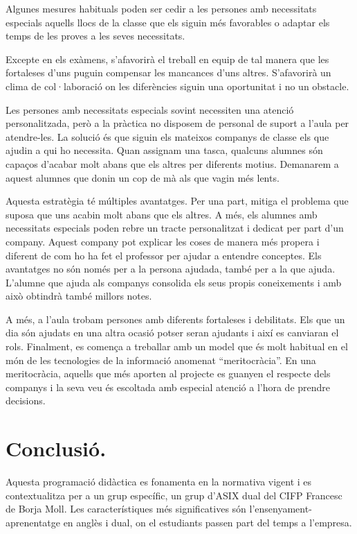 \documentclass[catalan, a4paper, 12pt, titlepage]{article}
\begin{document}
Algunes mesures habituals poden ser cedir a les persones amb necessitats especials aquells llocs de la classe que els siguin més favorables o adaptar els temps de les proves a les seves necessitats.

Excepte en els exàmens, s'afavorirà el treball en equip de tal manera que les fortaleses d'uns puguin compensar les mancances d'uns altres. S'afavorirà un clima de col·laboració on les diferències siguin una oportunitat i no un obstacle.

Les persones amb necessitats especials sovint necessiten una atenció personalitzada, però a la pràctica no disposem de personal de suport a l'aula per atendre-les.
La solució és que siguin els mateixos companys de classe els que ajudin a qui ho necessita.
Quan assignam una tasca, qualcuns alumnes són capaços d'acabar molt abans que els altres per diferents motius.
Demanarem a aquest alumnes que donin un cop de mà als que vagin més lents.

Aquesta estratègia té múltiples avantatges. 
Per una part, mitiga el problema que suposa que uns acabin molt abans que els altres.
A més, els alumnes amb necessitats especials poden rebre un tracte personalitzat i dedicat per part d'un company.
Aquest company pot explicar les coses de manera més propera i diferent de com ho ha fet el professor per ajudar a entendre conceptes.
Els avantatges no són només per a la persona ajudada, també per a la que ajuda.
L'alumne que ajuda als companys consolida els seus propis coneixements i amb això obtindrà també millors notes.

A més, a l'aula trobam persones amb diferents fortaleses i debilitats.
Els que un dia són ajudats en una altra ocasió potser seran ajudants i així es canviaran el rols.
Finalment, es comença a treballar amb un model que és molt habitual en el món de les tecnologies de la informació anomenat ``meritocràcia''.
En una meritocràcia, aquells que més aporten al projecte es guanyen el respecte dels companys i la seva veu és escoltada amb especial atenció a l'hora de prendre decisions.

\section{Conclusió.}
\label{sec:conclusió}

Aquesta programació didàctica es fonamenta en la normativa vigent i es contextualitza per a un grup específic, un grup d'ASIX dual del CIFP Francesc de Borja Moll.
Les característiques més significatives són l'ensenyament-aprenentatge en anglès i dual, on el estudiants passen part del temps a l'empresa.
\end{document}
